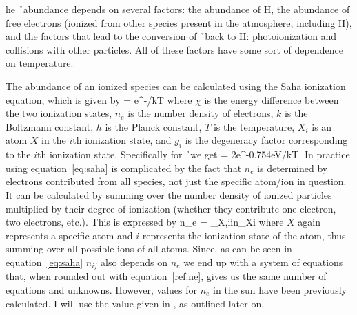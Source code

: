he \h\ abundance depends on several factors: the abundance of H, the
abundance of free electrons (ionized from other species present in the
atmosphere, including H), and the factors that lead to the conversion
of \h\ back to H: photoionization and collisions with other particles.  All
of these factors have some sort of dependence on temperature.



The abundance of an ionized species can be calculated using the Saha
ionization equation, which is given by
\beq
\label{eq:saha}
 = e^{-\chi/kT}
\eeq
 where $\chi$ is the energy difference between the two ionization
states, $n_e$ is the number density of electrons, $k$ is the Boltzmann
constant, $h$ is the Planck constant, $T$ is the temperature, $X_i$ is
an atom $X$ in the $i$th ionization state, and $g_i$ is the degeneracy
factor corresponding to the $i$th ionization state.  Specifically
for \h\ we get
\beq
\label{eq:thisone}
 = 2e^{-0.754\textrm{eV}/kT}.
\eeq
In practice using equation~\ref{eq:saha} is complicated by the fact that
$n_e$ is determined by electrons contributed from all species, not
just the specific atom/ion in question.  It can be calculated by
summing over the number density
of ionized particles multiplied by their degree of ionization (whether
they contribute one electron, two electrons, etc.). This is expressed by
\beq
\label{ref:ne}
n_e = \sum\limits_{X,i}i\times n_{Xi}
\eeq
where $X$ again represents a specific atom and $i$ represents the ionization state
of the atom, thus summing over all possible ions of all atoms.  Since,
as can be seen in equation~\ref{eq:saha} $n_{ij}$ also depends on
$n_e$ we end up with a system of equations that, when rounded out with
equation~\ref{ref:ne}, gives us the same number of equations and
unknowns.  However, values for $n_e$ in the sun have been previously
calculated. I will use the value given in \cite{boehm1989}, as
outlined later on.  

